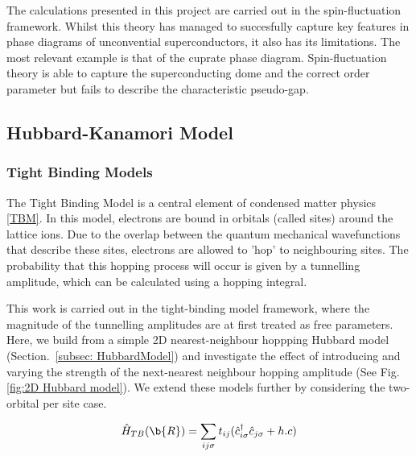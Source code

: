 \documentclass[12pt]{article}
\begin{document}
\noindent The calculations presented in this project are carried out in the spin-fluctuation framework. 
Whilst this theory has managed to succesfully capture key features in phase diagrams of unconvential superconductors, it also has its limitations.
The most relevant example is that of the cuprate phase diagram.
Spin-fluctuation theory is able to capture the superconducting dome and the correct order parameter \cite{moriya2006developments, scalapino1995case} 
but fails
to describe the characteristic pseudo-gap\cite{timusk1999pseudogap}. 

\subsection{Hubbard-Kanamori Model}

\subsubsection{Tight Binding Models}

The Tight Binding Model is a central element of condensed matter physics \eqref{TBM}. In this model, electrons are bound in orbitals (called sites) around the lattice ions.
Due to the overlap between the quantum mechanical wavefunctions that describe these sites, electrons are allowed to 'hop' to neighbouring sites. The probability that this hopping process will occur is given by a tunnelling amplitude, which can be calculated using a hopping integral. \par
\medskip
\noindent This work is carried out in the tight-binding model framework, where the magnitude of the tunnelling amplitudes are at first treated as free parameters. 
Here, we build from a simple 2D nearest-neighbour hoppping Hubbard model (Section.~\ref{subsec: HubbardModel}) and investigate the effect of introducing and varying the strength of the next-nearest neighbour hopping amplitude (See Fig. \ref{fig:2D Hubbard model}).
We extend these models further by considering the two-orbital per site case. 



\begin{equation} \label{TBM}
    \hat{H}_{TB}(\b{R}) = \sum_{ij\sigma} t_{ij}(\hat{c}_{i\sigma}^{\dagger}\hat{c}_{j \sigma} + h.c)
\end{equation}
\end{document}
